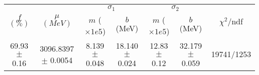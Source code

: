 \begin{tabular}{c|c|cc|cc||c}
 \multirow{2}{*}{$f$ $(\%)$} & \multirow{2}{*}{$\mu$ $(MeV)$} & \multicolumn{2}{|c|}{$\sigma_1$} & \multicolumn{2}{|c||}{$\sigma_2$} & \multirow{2}{*}{$\chi^2/$ndf} \\
 & & $m$ ($\times1e5$) & $b$ (MeV) & $m$ ($\times1e5$) & $b$ (MeV) & \\
\hline
69.93 $\pm$ 0.16 & 3096.8397 $\pm$ 0.0054 & 8.139 $\pm$ 0.048 & 18.140 $\pm$ 0.024 & 12.83 $\pm$ 0.12 & 32.179 $\pm$ 0.059 & 19741/1253\\
\end{tabular}
